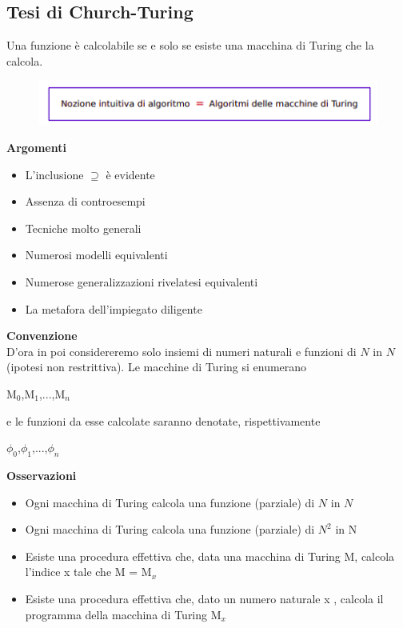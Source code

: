 \subsection{Tesi di Church-Turing}
Una funzione è calcolabile se e solo se esiste una macchina di Turing che la calcola.
\begin{figure}[htp]
    \centering
    \includegraphics[scale=0.8]{tesi_stile/img/tesi.png}
\end{figure}
\textbf{Argomenti}
\begin{itemize}
    \item L’inclusione $\supseteq$ è evidente
    
    \item Assenza di controesempi
    
    \item Tecniche molto generali
    
    \item Numerosi modelli equivalenti
    
    \item Numerose generalizzazioni rivelatesi equivalenti
    
    \item La metafora dell’impiegato diligente
\end{itemize}
\textbf{Convenzione}\\
D’ora in poi considereremo solo insiemi di numeri naturali e funzioni di $N$ in $N$ (ipotesi non restrittiva). Le macchine di Turing si enumerano
\begin{center}
    M$_0$,M$_1$,...,M$_n$
\end{center}
e le funzioni da esse calcolate saranno denotate, rispettivamente
\begin{center}
    $\phi_0$,$\phi_1$,...,$\phi_n$
\end{center}
\textbf{Osservazioni}
\begin{itemize}
    \item Ogni macchina di Turing calcola una funzione (parziale) di $N$ in $N$
    
    \item Ogni macchina di Turing calcola una funzione (parziale) di $N^2$ in N
    
    \item Esiste una procedura effettiva che, data una macchina di Turing M, calcola l’indice x tale che M = M$_x$
    
    \item Esiste una procedura effettiva che, dato un numero naturale x , calcola il programma della macchina di Turing M$_x$
\end{itemize}
